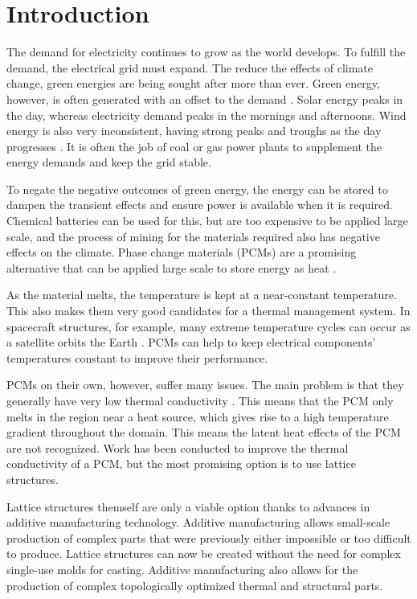 \chapter{Introduction}
\label{chap:intro}
The demand for electricity continues to grow as the world develops. To fulfill the demand, the electrical grid must expand. The reduce the effects of climate change, green energies are being sought after more than ever. Green energy, however, is often generated with an offset to the demand \cite{Mertens_2022}. Solar energy peaks in the day, whereas electricity demand peaks in the mornings and afternoons. Wind energy is also very inconsistent, having strong peaks and troughs as the day progresses \cite{Ernst_1999}. It is often the job of coal or gas power plants to supplement the energy demands and keep the grid stable. 

To negate the negative outcomes of green energy, the energy can be stored to dampen the transient effects and ensure power is available when it is required. Chemical batteries can be used for this, but are too expensive to be applied large scale, and the process of mining for the materials required also has negative effects on the climate. Phase change materials (PCMs) are a promising alternative that can be applied large scale to store energy as heat \cite{Datas_López-Ceballos_López_Ramos_del_Cañizo_2022}.

As the material melts, the temperature is kept at a near-constant temperature. This also makes them very good candidates for a thermal management system. In spacecraft structures, for example, many extreme temperature cycles can occur as a satellite orbits the Earth \cite{Gordo_Frederico_Melicio_Duzellier_Amorim_2020}. PCMs can help to keep electrical components' temperatures constant to improve their performance.

PCMs on their own, however, suffer many issues. The main problem is that they generally have very low thermal conductivity \cite{Reza_Vakhshouri_2020}. This means that the PCM only melts in the region near a heat source, which gives rise to a high temperature gradient throughout the domain. This means the latent heat effects of the PCM are not recognized. Work has been conducted \cite{Xu_Zhang_Fang_2022} to improve the thermal conductivity of a PCM, but the most promising option is to use lattice structures.

Lattice structures themself are only a viable option thanks to advances in additive manufacturing technology. Additive manufacturing allows small-scale production of complex parts that were previously either impossible or too difficult to produce. Lattice structures can now be created without the need for complex single-use molds for casting. Additive manufacturing also allows for the production of complex topologically optimized thermal and structural parts.

